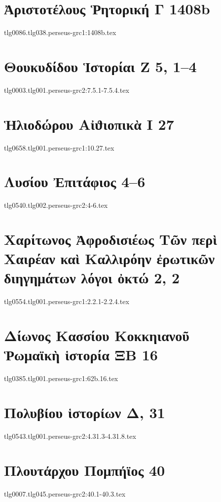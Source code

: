 \documentclass[a4paper,12pt,twoside]{report}
\begin{document}
\chapter[Ἀριστοτέλους Ῥητορική Γ]{\textgreek[variant=ancient]{Ἀριστοτέλους Ῥητορική Γ} 1408b}
{tlg0086.tlg038.perseus-grc1:1408b.tex}
\chapter[Θουκυδίδου Ἱστορίαι Ζ]{\textgreek[variant=ancient]{Θουκυδίδου Ἱστορίαι Ζ} 5, 1–4}
{tlg0003.tlg001.perseus-grc2:7.5.1-7.5.4.tex}
\chapter[Ἡλιοδώρου Αἰϑιοπικὰ Ι]{\textgreek[variant=ancient]{Ἡλιοδώρου Αἰϑιοπικὰ Ι} 27}
{tlg0658.tlg001.perseus-grc1:10.27.tex}
\chapter[Λυσίου Ἐπιτάφιος]{\textgreek[variant=ancient]{Λυσίου Ἐπιτάφιος} 4–6}
{tlg0540.tlg002.perseus-grc2:4-6.tex}
\chapter[Χαρίτωνος Τὰ περὶ Χαιρέαν καὶ Καλλιρόην]{\textgreek[variant=ancient]{Χαρίτωνος Ἀφροδισιέως Τῶν περὶ Χαιρέαν καὶ Καλλιρόην ἐρωτικῶν διηγημάτων λόγοι ὀκτώ} 2, 2}
{tlg0554.tlg001.perseus-grc1:2.2.1-2.2.4.tex}
\chapter[Δίωνος Κασσίου Ῥωμαϊκὴ ἱστορία ΞΒ 16]{\textgreek[variant=ancient]{Δίωνος Κασσίου Κοκκηιανοῦ\\Ῥωμαϊκὴ ἱστορία ΞΒ} 16}
{tlg0385.tlg001.perseus-grc1:62b.16.tex}
\chapter[Πολυβίου Ἱστορίων Δ]{\textgreek[variant=ancient]{Πολυβίου ἱστορίων Δ,} 31}
{tlg0543.tlg001.perseus-grc2:4.31.3-4.31.8.tex}
%
\chapter[Πλουτάρχου Πομπήϊος]{\textgreek[variant=ancient]{Πλουτάρχου Πομπήϊος} 40}
{tlg0007.tlg045.perseus-grc2:40.1-40.3.tex}
\end{document}

